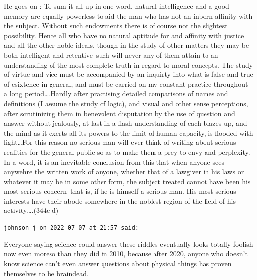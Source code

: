 \begin{footnotesize}
\begin{sffamily}
He goes on : To sum it all up in one word, natural intelligence and a good memory are equally powerless to aid the man
who has not an inborn affinity with the subject. Without such endowments there is of course not the slightest
possibility. Hence all who have no natural aptitude for and affinity with justice and all the other noble ideals,
though in the study of other matters they may be both intelligent and retentive–such will never any of them attain to
an understanding of the most complete truth in regard to moral concepts. The study of virtue and vice must be
accompanied by an inquirty into what is false and true of esixtence in general, and must be carried on my constant
practice throughout a long period….Hardly after practising detailed comparisons of names and definitions (I assume the
study of logic), and visual and other sense perceptions, after scrutinizing them in benevolent disputation by the use
of question and answer without jealously, at last in a flash understanding of each blazes up, and the mind as it exerts
all its powers to the limit of human capacity, is flooded with light…For this reason no serious man will ever think of
writing about serious realities for the general public so as to make them a prey to envy and perplexity. In a word, it
is an inevitable conclusion from this that when anyone sees anywehre the written work of anyone, whether that of a
lawgiver in his laws or whatever it may be in some other form, the subject treated cannot have been his most serious
concern–that is, if he is himself a serious man. His most serious interests have their abode somewhere in the noblest
region of the field of his activity….(344c-d)


\hfill

\texttt{johnson j on 2022-07-07 at 21:57 said: }

Everyone saying science could answer these riddles eventually looks totally foolish now even moreso than they did in
2010, because after 2020, anyone who doesn't know science can't even answer
questions about physical things has proven themselves to be braindead.


\end{sffamily}\end{footnotesize}
